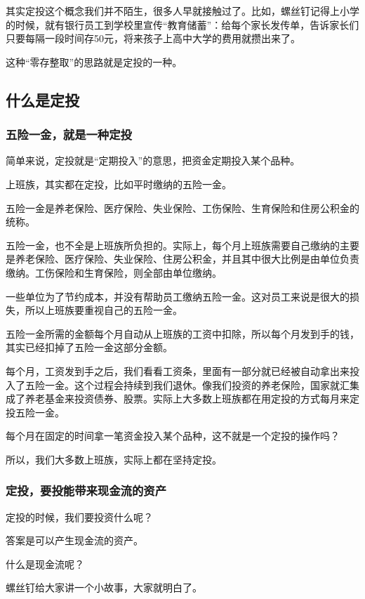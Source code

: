 \setcounter{figure}{0}\setcounter{table}{0}
其实定投这个概念我们并不陌生，很多人早就接触过了。比如，螺丝钉记得上小学的时候，就有银行员工到学校里宣传“教育储蓄”：给每个家长发传单，告诉家长们只要每隔一段时间存50元，将来孩子上高中大学的费用就攒出来了。

这种“零存整取”的思路就是定投的一种。

\subsection{什么是定投}
\subsubsection{五险一金，就是一种定投}

简单来说，定投就是“定期投入”的意思，把资金定期投入某个品种。

上班族，其实都在定投，比如平时缴纳的五险一金。

五险一金是养老保险、医疗保险、失业保险、工伤保险、生育保险和住房公积金的统称。

五险一金，也不全是上班族所负担的。实际上，每个月上班族需要自己缴纳的主要是养老保险、医疗保险、失业保险、住房公积金，并且其中很大比例是由单位负责缴纳。工伤保险和生育保险，则全部由单位缴纳。

一些单位为了节约成本，并没有帮助员工缴纳五险一金。这对员工来说是很大的损失，所以上班族要重视自己的五险一金。

五险一金所需的金额每个月自动从上班族的工资中扣除，所以每个月发到手的钱，其实已经扣掉了五险一金这部分金额。

每个月，工资发到手之后，我们看看工资条，里面有一部分就已经被自动拿出来投入了五险一金。这个过程会持续到我们退休。像我们投资的养老保险，国家就汇集成了养老基金来投资债券、股票。实际上大多数上班族都在用定投的方式每月来定投五险一金。

每个月在固定的时间拿一笔资金投入某个品种，这不就是一个定投的操作吗？

所以，我们大多数上班族，实际上都在坚持定投。

\subsubsection{定投，要投能带来现金流的资产}

定投的时候，我们要投资什么呢？

答案是可以产生现金流的资产。

什么是现金流呢？

螺丝钉给大家讲一个小故事，大家就明白了。

